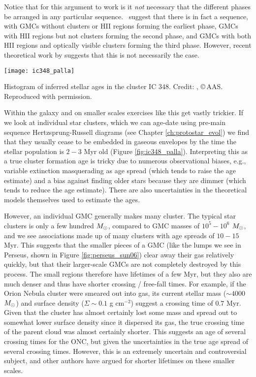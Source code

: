 Notice that for this argument to work is it {\it not} necessary that the different phases be arranged in any particular sequence. \citeauthor{kawamura09a}~suggest that there is in fact a sequence, with GMCs without clusters or HII regions forming the earliest phase, GMCs with HII regions but not clusters forming the second phase, and GMCs with both HII regions and optically visible clusters forming the third phase. However, recent theoretical work by \citet{goldbaum11a} suggests that this is not necessarily the case.

\begin{marginfigure}
\texttt{[image: ic348\_palla]}
\caption[Histogram of stellar ages in IC 348]{
\label{fig:ic348_palla}
Histogram of inferred stellar ages in the cluster IC 348. Credit: \citet{palla00a}, \copyright\,AAS. Reproduced with permission.
}
\end{marginfigure}

Within the galaxy and on smaller scales exercises like this get vastly trickier. If we look at individual star clusters, which we can age-date using pre-main sequence Hertzsprung-Russell diagrams (see Chapter \ref{ch:protostar_evol}) we find that they usually cease to be embedded in gaseous envelopes by the time the stellar population is $2-3$ Myr old (Figure \ref{fig:ic348_palla}). Interpreting this as a true cluster formation age is tricky due to numerous observational biases, e.g., variable extinction masquerading as age spread (which tends to raise the age estimate) and a bias against finding older stars because they are dimmer (which tends to reduce the age estimate). There are also uncertainties in the theoretical models themselves used to estimate the ages.

However, an individual GMC generally makes many cluster. The typical star clusters is only a few hundred $M_{\odot}$, compared to GMC masses of $10^5-10^6$ $M_{\odot}$, and we see associations made up of many clusters with age spreads of $10-15$ Myr. This suggests that the smaller pieces of a GMC (like the lumps we see in Perseus, shown in Figure \ref{fig:perseus_sun06}) clear away their gas relatively quickly, but that their larger-scale GMCs are not completely destroyed by this process.  The small regions therefore have lifetimes of a few Myr, but they also are much denser and thus have shorter crossing / free-fall times. For example, if the Orion Nebula cluster were smeared out into gas, its current stellar mass ($\sim 4000$ $M_{\odot}$) and surface density ($\Sigma \sim 0.1$ g cm$^{-2}$) suggest a crossing time of $0.7$ Myr. Given that the cluster has almost certainly lost some mass and spread out to somewhat lower surface density since it dispersed its gas, the true crossing time of the parent cloud was almost certainly shorter. This suggests an age of several crossing times for the ONC, but given the uncertainties in the true age spread of several crossing times. However, this is an extremely uncertain and controversial subject, and other authors have argued for shorter lifetimes on these smaller scales.


